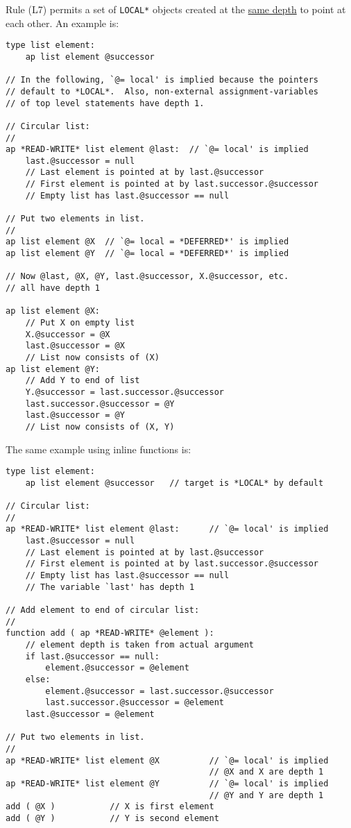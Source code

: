 \documentclass[12pt]{article}
\newenvironment{indpar}[1][0.3in]%
	{\begin{list}{}%
		     {\setlength{\itemsep}{0in}%
		      \setlength{\topsep}{0in}%
		      \setlength{\parsep}{1ex}%
		      \setlength{\labelwidth}{#1}%
		      \setlength{\leftmargin}{#1}%
		      \addtolength{\leftmargin}{\labelsep}}%
	 \item}%
	{\end{list}}
\begin{document}
Rule (L7) permits a set of {\tt *LOCAL*} objects created at the
\underline{same depth} to point at each other.
An example is:
\begin{indpar}\begin{verbatim}
type list element:
    ap list element @successor

// In the following, `@= local' is implied because the pointers
// default to *LOCAL*.  Also, non-external assignment-variables
// of top level statements have depth 1.

// Circular list:
//
ap *READ-WRITE* list element @last:  // `@= local' is implied
    last.@successor = null
    // Last element is pointed at by last.@successor
    // First element is pointed at by last.successor.@successor
    // Empty list has last.@successor == null

// Put two elements in list.
//
ap list element @X  // `@= local = *DEFERRED*' is implied
ap list element @Y  // `@= local = *DEFERRED*' is implied

// Now @last, @X, @Y, last.@successor, X.@successor, etc.
// all have depth 1

ap list element @X:
    // Put X on empty list
    X.@successor = @X
    last.@successor = @X
    // List now consists of (X)
ap list element @Y:
    // Add Y to end of list
    Y.@successor = last.successor.@successor 
    last.successor.@successor = @Y
    last.@successor = @Y
    // List now consists of (X, Y)
\end{verbatim}\end{indpar}


The same example using inline functions is:
\begin{indpar}\begin{verbatim}
type list element:
    ap list element @successor   // target is *LOCAL* by default

// Circular list:
//
ap *READ-WRITE* list element @last:      // `@= local' is implied
    last.@successor = null
    // Last element is pointed at by last.@successor
    // First element is pointed at by last.successor.@successor
    // Empty list has last.@successor == null
    // The variable `last' has depth 1

// Add element to end of circular list:
//
function add ( ap *READ-WRITE* @element ):
    // element depth is taken from actual argument
    if last.@successor == null:
        element.@successor = @element
    else:
        element.@successor = last.successor.@successor
        last.successor.@successor = @element
    last.@successor = @element

// Put two elements in list.
//
ap *READ-WRITE* list element @X          // `@= local' is implied
                                         // @X and X are depth 1
ap *READ-WRITE* list element @Y          // `@= local' is implied
                                         // @Y and Y are depth 1
add ( @X )           // X is first element
add ( @Y )           // Y is second element
\end{verbatim}\end{indpar}
\end{document}
